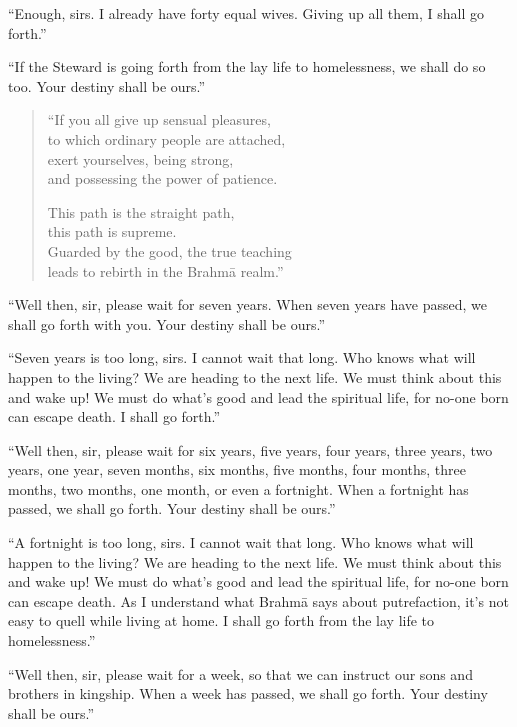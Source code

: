\documentclass[12pt,openany]{book}%
\begin{document}
“Enough, sirs. I already have forty equal wives. Giving up all them, I shall go forth.” 

“If the Steward is going forth from the lay life to homelessness, we shall do so too. Your destiny shall be ours.” 

\begin{verse}%
“If you all give up sensual pleasures, \\
to which ordinary people are attached, \\
exert yourselves, being strong, \\
and possessing the power of patience. 

This path is the straight path, \\
this path is supreme. \\
Guarded by the good, the true teaching \\
leads to rebirth in the \textsanskrit{Brahmā} realm.” 

%
\end{verse}

“Well then, sir, please wait for seven years. When seven years have passed, we shall go forth with you. Your destiny shall be ours.” 

“Seven years is too long, sirs. I cannot wait that long. Who knows what will happen to the living? We are heading to the next life. We must think about this and wake up! We must do what’s good and lead the spiritual life, for no-one born can escape death. I shall go forth.” 

“Well then, sir, please wait for six years, five years, four years, three years, two years, one year, seven months, six months, five months, four months, three months, two months, one month, or even a fortnight. When a fortnight has passed, we shall go forth. Your destiny shall be ours.” 

“A fortnight is too long, sirs. I cannot wait that long. Who knows what will happen to the living? We are heading to the next life. We must think about this and wake up! We must do what’s good and lead the spiritual life, for no-one born can escape death. As I understand what \textsanskrit{Brahmā} says about putrefaction, it’s not easy to quell while living at home. I shall go forth from the lay life to homelessness.” 

“Well then, sir, please wait for a week, so that we can instruct our sons and brothers in kingship. When a week has passed, we shall go forth. Your destiny shall be ours.” 
\end{document}
